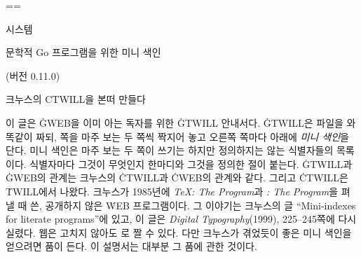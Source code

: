\def\bull{\smallskip\item{$\bullet$}}

\def\begincode{\par\medskip\begingroup
  \def\do##1{\catcode`##1=12 }\dospecials
  \catcode`\|=0 \def\par{\endgraf\nobreak}%
  \obeylines \obeyspaces \tt \parindent=0pt \leftskip=\parindent\relax}
\def\endcode{\endgroup\medskip\noindent}

\def\sampleentry#1{\hbox{#1}}
\def\samplemini#1#2#3{\par\medskip
  \hrule\kern4pt
  \hbox to\hsize{\eightrm \def\it{\eightit}\def\bf{\eightbf}\let\tt=\eighttt
    \baselineskip=9pt \vtop{#1}\hfil\vtop{#2}\hfil\vtop{#3}}%
  \medskip\noindent}

\def\runninghead{{\ninett GTWILL} 사용자 설명서 (버전 0.11.0)}
\def\lheader{\mainfont\folio\hfil{\eightrm\eightgt\runninghead}\hfil}
\def\rheader{\hfil{\eightrm\eightgt\runninghead}\hfil\mainfont\folio}

\headline={\hfil}\footline={\hfil}
\null\vfill
\centerline{ 시스템}
\vskip 6pt
\centerline{\chapterfont 문학적 Go 프로그램을 위한 미니 색인}
\vskip 18pt
\centerline{(버전 0.11.0)}
\vskip 24pt
\centerline{\authorfont 크누스의 {\ttitlefont CTWILL}을 본떠 만들다}
\vfill
\noindent
이 글은 \.{GWEB}을 이미 아는 독자를 위한 \.{GTWILL} 안내서다. \.{GTWILL}은
 파일을 와 똑같이 짜되, 쪽을 마주 보는 두 쪽씩 짝지어 놓고
오른쪽 쪽마다 아래에 {\it 미니 색인\/}을 단다. 미니 색인은 마주 보는 두 쪽이
쓰기는 하지만 정의하지는 않는 식별자들의 목록이다. 식별자마다 그것이 무엇인지
한마디와 그것을 정의한 절이 붙는다. \.{GTWILL}과 \.{GWEB}의 관계는 크누스의
\.{CTWILL}과 \.{CWEB}의 관계와 같다. 그리고 \.{CTWILL}은 \.{TWILL}에서 나왔다.
크누스가 1985년에 {\sl \TeX: The Program\/}과 {\sl \slMF: The Program\/}을
펴낼 때 쓴, 공개하지 않은 \.{WEB} 프로그램이다. 그 이야기는 크누스의 글
``Mini-indexes for literate programs''에 있고, 이 글은 {\sl Digital
Typography\/}(1999), 225--245쪽에 다시 실렸다. 웹은 고치지 않아도 로
짤 수 있다. 다만 크누스가 겪었듯이 좋은 미니 색인을 얻으려면 품이 든다. 이
설명서는 대부분 그 품에 관한 것이다.
\vfil\eject

